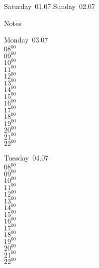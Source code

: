\documentclass[11pt,a4paper]{book}\usepackage[]{graphicx}\usepackage[]{color}
\begin{document}
\begin{weekendbox}
  Saturday~01.07
  \tcblower
  Sunday~02.07
\end{weekendbox} %
\begin{notebox}
  Notes
\end{notebox}
\clearpage
\begin{headerbox}
\end{headerbox}
\begin{weekdaybox}
  Monday~03.07\\
  { 
  \vfill
  $08^{00}$\\
$09^{00}$\\
$10^{00}$\\
$11^{00}$\\
$12^{00}$\\
$13^{00}$\\
$14^{00}$\\
$15^{00}$\\
$16^{00}$\\
$17^{00}$\\
$18^{00}$\\
$19^{00}$\\
$20^{00}$\\
$21^{00}$\\
$22^{00}$\\
  }
\end{weekdaybox}
\begin{weekdaybox}
  Tuesday~04.07\\
  { 
  \vfill
  $08^{00}$\\
$09^{00}$\\
$10^{00}$\\
$11^{00}$\\
$12^{00}$\\
$13^{00}$\\
$14^{00}$\\
$15^{00}$\\
$16^{00}$\\
$17^{00}$\\
$18^{00}$\\
$19^{00}$\\
$20^{00}$\\
$21^{00}$\\
$22^{00}$\\
  }
\end{weekdaybox}
\end{document}
